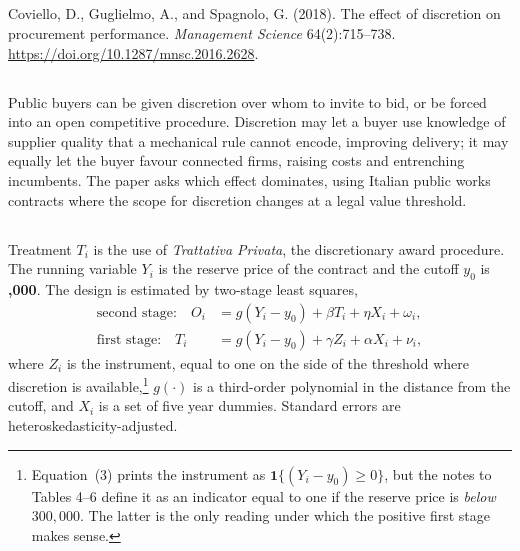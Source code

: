 \documentclass[11pt]{article}
\begin{document}
\subsection{}
Coviello, D., Guglielmo, A., and Spagnolo, G. (2018). The effect of discretion
on procurement performance. \emph{Management Science} 64(2):715--738.
\url{https://doi.org/10.1287/mnsc.2016.2628}.

\subsection{}
Public buyers can be given discretion over whom to invite to bid, or be forced
into an open competitive procedure. Discretion may let a buyer use knowledge of
supplier quality that a mechanical rule cannot encode, improving delivery; it
may equally let the buyer favour connected firms, raising costs and entrenching
incumbents. The paper asks which effect dominates, using Italian public works
contracts where the scope for discretion changes at a legal value threshold.

\subsection{}
Treatment $T_i$ is the use of \emph{Trattativa Privata}, the discretionary
award procedure. The running variable $Y_i$ is the reserve price of the
contract and the cutoff $y_0$ is \textbf{,000}. The design is
estimated by two-stage least squares,
\begin{align*}
\text{second stage:}\quad O_i &= g(Y_i - y_0) + \beta T_i + \eta X_i
  + \omega_i, \\
\text{first stage:}\quad T_i &= g(Y_i - y_0) + \gamma Z_i + \alpha X_i
  + \nu_i,
\end{align*}
where $Z_i$ is the instrument, equal to one on the side of the threshold where
discretion is available,\footnote{Equation~(3) prints the instrument as
$\mathbf{1}\{(Y_i - y_0) \geq 0\}$, but the notes to Tables 4--6 define it as an
indicator equal to one if the reserve price is \emph{below}
\texteuro$300{,}000$. The latter is the only reading under which the positive
first stage makes sense.} $g(\cdot)$ is a third-order polynomial in
the distance from the cutoff, and $X_i$ is a set of five year dummies.
Standard errors are heteroskedasticity-adjusted.
\end{document}
